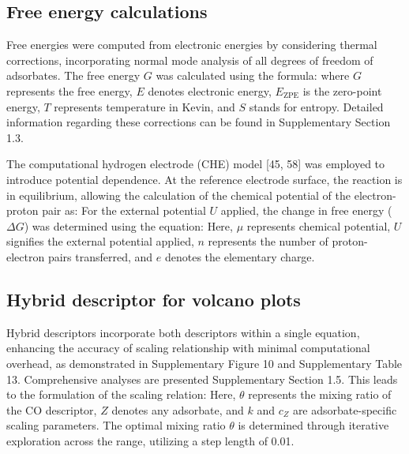 \subsection{Free energy calculations}
Free energies were computed from electronic energies by considering thermal corrections, incorporating normal mode analysis of all degrees of freedom of adsorbates.
The free energy $\textit{G}$ was calculated using the formula:
where $\textit{G}$ represents the free energy, $\textit{E}$ denotes electronic energy, $\textit{E}_{\text{ZPE}}$ is the zero-point energy, $\textit{T}$ represents temperature in Kevin, and $\textit{S}$ stands for entropy.
Detailed information regarding these corrections can be found in Supplementary Section 1.3.

The computational hydrogen electrode (CHE) model [45, 58] was employed to introduce potential dependence.
At the reference electrode surface, the reaction
is in equilibrium, allowing the calculation of the chemical potential of the electron-proton pair as:
For the external potential $\textit{U}$ applied, the change in free energy ($\Delta \textit{G}$) was determined using the equation:
Here, $\mu$ represents chemical potential, $\textit{U}$ signifies the external potential applied, $\textit{n}$ represents the number of proton-electron pairs transferred, and $\textit{e}$ denotes the elementary charge.


\subsection{Hybrid descriptor for volcano plots}
Hybrid descriptors incorporate both descriptors within a single equation, enhancing the accuracy of scaling relationship with minimal computational overhead, as demonstrated in Supplementary Figure 10 and Supplementary Table 13.
Comprehensive analyses are presented Supplementary Section 1.5. This leads to the formulation of the scaling relation:
Here, $\theta$ represents the mixing ratio of the CO descriptor, $\textit{Z}$ denotes any adsorbate, and $\textit{k}$ and $\textit{c}_{Z}$ are adsorbate-specific scaling parameters.
The optimal mixing ratio $\theta$ is determined through iterative exploration across the range, utilizing a step length of 0.01.

